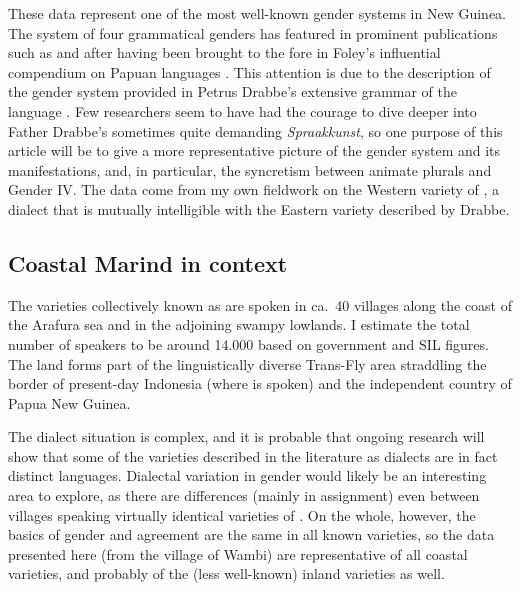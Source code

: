 \documentclass[output=collectionpaper]{langsci/langscibook}
\begin{document}
These data represent one of the most well-known gender systems in New Guinea. The  system of four grammatical genders has featured in prominent publications such as \textcite[116]{Corbett1991} and \textcite[60]{Aikhenvald2000} after having been brought to the fore in Foley's influential compendium on Papuan languages \parencite[82--83]{Foley1986}. This attention is due to the description of the gender system provided in Petrus Drabbe's extensive grammar of the language \parencite{Drabbe1955}. Few researchers seem to have had the courage to dive deeper into Father Drabbe's sometimes quite demanding \emph{Spraakkunst}, so one purpose of this article will be to give a more representative picture of the gender system and its manifestations, and, in particular, the syncretism between animate plurals and Gender IV. The data come from my own fieldwork on the Western variety of , a dialect that is mutually intelligible with the Eastern variety described by Drabbe.

\subsection{Coastal Marind in context}
\label{sec:Bruno:context}
The varieties collectively known as  are spoken in ca.~40 villages along the coast of the Arafura sea and in the adjoining swampy lowlands. I estimate the total number of speakers to be around 14.000 based on government and SIL figures. The  land forms part of the linguistically diverse Trans-Fly area \parencite{Evans2012,Evans2018} straddling the border of present-day Indonesia (where  is spoken) and the independent country of Papua New Guinea.

The dialect situation is complex, and it is probable that ongoing research will show that some of the varieties described in the literature as dialects are in fact distinct languages. Dialectal variation in gender would likely be an interesting area to explore, as there are differences (mainly in assignment) even between villages speaking virtually identical varieties of . On the whole, however, the basics of gender and agreement are the same in all known varieties, so the data presented here (from the village of Wambi) are representative of all coastal varieties, and probably of the (less well-known) inland varieties as well.
\end{document}
